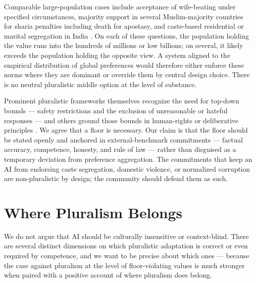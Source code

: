 \documentclass{article}
\theoremstyle{plain}
\theoremstyle{definition}
\theoremstyle{remark}
\begin{document}
Comparable large-population cases include acceptance of wife-beating under specified circumstances, majority support in several Muslim-majority countries for sharia penalties including death for apostasy, and caste-based residential or marital segregation in India \citep{unicef2014hidden, pew2013worldsmuslims, pew2021india}. On each of these questions, the population holding the value runs into the hundreds of millions or low billions; on several, it likely exceeds the population holding the opposite view. A system aligned to the empirical distribution of global preferences would therefore either enforce these norms where they are dominant or override them by central design choice. There is no neutral pluralistic middle option at the level of substance.

Prominent pluralistic frameworks themselves recognize the need for top-down bounds --- safety restrictions and the exclusion of unreasonable or hateful responses \citep{sorensen2024roadmap} --- and others ground those bounds in human-rights or deliberative principles \citep{gabriel2020artificial, kasirzadeh2023conversation}. We agree that a floor is necessary. Our claim is that the floor should be stated openly and anchored in external-benchmark commitments --- factual accuracy, competence, honesty, and rule of law --- rather than disguised as a temporary deviation from preference aggregation. The commitments that keep an AI from endorsing caste segregation, domestic violence, or normalized corruption are non-pluralistic by design; the community should defend them as such.

\section{Where Pluralism Belongs}
\label{sec:pluralism}

We do not argue that AI should be culturally insensitive or context-blind. There are several distinct dimensions on which pluralistic adaptation is correct or even required by competence, and we want to be precise about which ones --- because the case against pluralism at the level of floor-violating values is much stronger when paired with a positive account of where pluralism does belong.
\end{document}
